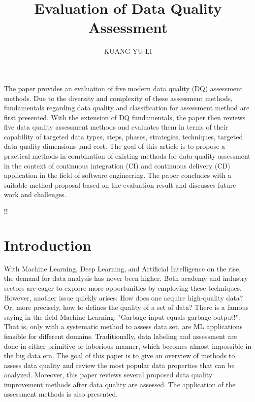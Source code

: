 \documentclass[pdftex,english,oribibl]{llncs}
\title{Evaluation of Data Quality Assessment}
\author{KUANG-YU LI}
\institute{University of Stuttgart\\Master Student in Information Technology \\70569 Stuttgart, Germany}
\makeatletter
\gdef\@keywords{}
\renewenvironment{abstract}{%
  \list{}{\advance\topsep by0.35cm\relax\small%
          \leftmargin=1cm%
          \labelwidth=\z@%
          \listparindent=\z@%
          \itemindent\listparindent%
          \rightmargin\leftmargin}%
          \item[\hskip\labelsep\bfseries\abstractname]}{%
  \if!\@keywords!\else{\item[~]\item[\hskip\labelsep\bfseries\keywordname]\@keywords}\fi%
  \endlist}
\makeatother
\begin{document}
\maketitle

\begin{abstract}
   The paper provides an evaluation of five modern data quality (DQ) assessment methods. Due to the diversity and complexity of these assessment methods, fundamentals regarding data quality and classification for assessment method are first presented. With the extension of DQ fundamentals, the paper then reviews five data quality assessment methods and evaluates them in terms of their capability of targeted data types, steps, phases, strategies, techniques, targeted data quality dimensions ,and cost. The goal of this article is to propose a practical methods in combination of existing methods for data quality assessment in the context of  continuous integration (CI) and  continuous delivery (CD) application in the field of software engineering. The paper concludes with a suitable method proposal based on the evaluation result and discusses future work and challenges.

\end{abstract}
\section{Introduction}
With Machine Learning, Deep Learning, and Artificial Intelligence on the rise, the demand for data analysis has never been higher. Both academy and industry sectors are eager to explore more opportunities by employing these techniques. However, another issue quickly arises: How does one acquire high-quality data? Or, more precisely, how to defines the quality of a set of data? There is a famous saying in the field Machine Learning: "Garbage input equals garbage output!". That is, only with a systematic method to assess data set, are ML applications feasible for different domains. Traditionally, data labeling and assessment are done in either primitive or laborious manner, which becomes almost impossible in the big data era. The goal of this paper is to give an overview of methods to assess data quality and review the most popular data properties that can be analyzed. Moreover, this paper reviews several proposed data quality improvement methods after data quality are assessed. The application of the assessment methods is also presented.
\end{document}
